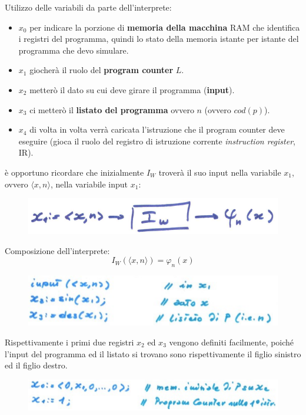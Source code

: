 \documentclass{article}
\begin{document}
Utilizzo delle variabili da parte dell'interprete:
\begin{itemize}
    \item $x_0$ per indicare la porzione di \textbf{memoria della macchina} RAM
          che identifica i registri del programma, quindi lo stato della memoria istante
          per istante del programma che devo simulare.
    \item $x_1$ giocherà il ruolo del \textbf{program counter} $L$.
    \item $x_2$ metterò il dato su cui deve girare il programma (\textbf{input}).
    \item $x_3$ ci metterò il \textbf{listato del programma} ovvero $n$ (ovvero $cod(p)$).
    \item $x_4$ di volta in volta verrà caricata l'istruzione che il
          program counter deve eseguire (gioca il ruolo del registro di istruzione
          corrente \textit{instruction register}, IR).
\end{itemize}
è opportuno ricordare che inizialmente $I_W$ troverà il suo input nella variabile
$x_1$, ovvero $\langle x,n\rangle$, nella variabile input $x_1$:
\begin{figure}[H]
    \centering
    \includegraphics[scale=0.5]{images/x_1.png}
\end{figure}
Composizione dell'interprete:
$$I_W(\langle x,n\rangle)=\varphi_n(x)$$
\begin{figure}[H]
    \centering
    \includegraphics[scale=0.5]{images/inter_0.png}
\end{figure}
Rispettivamente i primi due registri $x_2$ ed $x_3$ vengono definiti facilmente, poiché
l'input del programma ed il listato si trovano sono rispettivamente il figlio sinistro
ed il figlio destro.
\begin{figure}[H]
    \centering
    \includegraphics[scale=0.5]{images/inter_1.png}
\end{figure}
\end{document}
